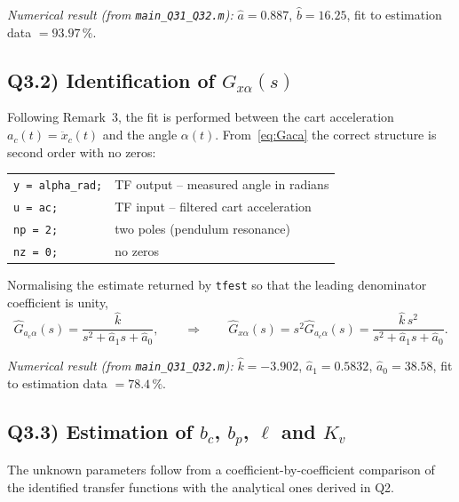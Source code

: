 \documentclass[11pt,a4paper]{article}
\newcommand{\ddd}[1]{\ddot{#1}}
\renewcommand{\l}{\ell}
\begin{document}
\emph{Numerical result (from \texttt{main\_Q31\_Q32.m}):}
$\hat a = 0.887$, $\hat b = 16.25$,
fit to estimation data $=93.97\,\%$.

\subsection*{Q3.2) Identification of $G_{x\alpha}(s)$}

Following Remark~3, the fit is performed between the cart acceleration
$a_c(t)=\ddd x_c(t)$ and the angle $\alpha(t)$. From~\eqref{eq:Gaca} the
correct structure is second order with no zeros:
\begin{center}
\begin{tabular}{@{}ll@{}}
\toprule
\texttt{y  = alpha\_rad;} & TF output -- measured angle in radians \\
\texttt{u  = ac;}         & TF input  -- filtered cart acceleration \\
\texttt{np = 2;}          & two poles (pendulum resonance) \\
\texttt{nz = 0;}          & no zeros \\
\bottomrule
\end{tabular}
\end{center}
Normalising the estimate returned by \texttt{tfest} so that the leading
denominator coefficient is unity,
\begin{equation}
\hat G_{a_c\alpha}(s)
= \frac{\hat k}{s^{2}+\hat a_1 s+\hat a_0},
\qquad\Longrightarrow\qquad
\hat G_{x\alpha}(s)=s^{2}\hat G_{a_c\alpha}(s)
= \frac{\hat k\, s^{2}}{s^{2}+\hat a_1 s+\hat a_0}.
\label{eq:id_aca}
\end{equation}

\emph{Numerical result (from \texttt{main\_Q31\_Q32.m}):}
$\hat k = -3.902$, $\hat a_1 = 0.5832$,
$\hat a_0 = 38.58$,
fit to estimation data $=78.4\,\%$.

\subsection*{Q3.3) Estimation of $b_c$, $b_p$, $\l$ and $K_v$}

The unknown parameters follow from a coefficient-by-coefficient comparison
of the identified transfer functions with the analytical ones derived in
Q2.
\end{document}
